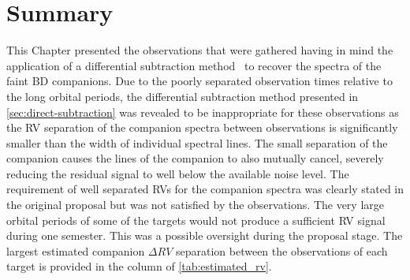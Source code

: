 \section{Summary}
This Chapter presented the observations that were gathered having in mind the application of a differential subtraction method~\citep[e.g.][]{ferluga_separating_1997, kostogryz_spectral_2013} to recover the spectra of the faint {BD} companions.  Due to the poorly separated observation times relative to the long orbital periods, the differential subtraction method presented in \cref{sec:direct-subtraction} was revealed to be inappropriate for these observations as the {RV} separation of the companion spectra between observations is significantly smaller than the width of individual spectral lines.
The small separation of the companion causes the lines of the companion to also mutually cancel, severely reducing the residual signal to well below the available noise level.
The requirement of well separated RVs for the companion spectra was clearly stated in the original proposal but was not satisfied by the observations. {\red{} The very large orbital periods of some of the targets would not produce a sufficient {RV} signal during one semester.
This was a possible oversight during the proposal stage.} The largest estimated companion \(\Delta {RV}\) separation between the observations of each target is provided in the   column of \cref{tab:estimated_rv}. 

